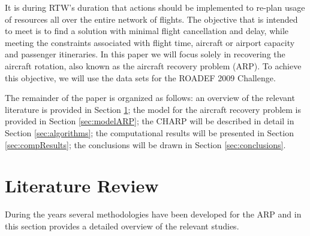 \documentclass[ijoo,nonblindrev]{informs-ijoo}
\begin{document}
It is during RTW’s duration that actions should be implemented to re-plan usage of resources all over the entire network of flights. The objective that is intended to meet is to find a solution with minimal flight cancellation and delay, while meeting the constraints associated with flight time, aircraft or airport capacity and passenger itineraries. In this paper we will focus solely in recovering the aircraft rotation, also known as the aircraft recovery problem (ARP). To achieve this objective, we will use the data sets for the ROADEF 2009 Challenge. 
\begin{comment}
Every two years the \textit{French society of Operational Research and Decision Making} releases the ROADEF Challenge, which consists on a competition to solve a complex optimization problem that occurs in industry. In the ROADEF 2009 Challenge there is a step-wise simplification of a model, for disruption management in commercial aviation that aims at finding recovery planning of flights, aircraft assignments and passengers (including flight leg cancellation) on a given maximal horizon, so that a sum of penalties corresponding to various costs or discomforts is minimized. The present work is based on ROADEF 2009 Challengee and intends to develop a series of methodologies that will result in the generation of recovery processes for the disruptions induced by flight delays or cancellations, aircraft availability shortage or airport capacity decrease.\\

After retrieving the results for the ARRP using our algorithm, we will validate it using a flight schedule based on citep francis2020
\end{comment}


The remainder of the paper is organized as follows: an overview of the relevant literature is provided in Section \ref{sec:litRev}; the model for the aircraft  recovery problem is provided in Section \ref{sec:modelARP}; the  CHARP will be described in detail in Section \ref{sec:algorithms}; the computational results will be presented in Section \ref{sec:compResults}; the conclusions will be drawn in Section \ref{sec:conclusions}.


\section{Literature Review}\label{sec:litRev}


During the years several methodologies have been developed for the ARP and in this section provides a detailed overview of the relevant studies.
\end{document}
